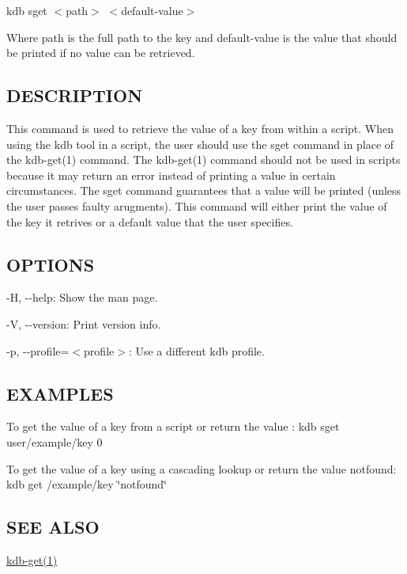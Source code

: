 {\ttfamily kdb sget $<$path$>$ $<$default-\/value$>$}

Where {\ttfamily path} is the full path to the key and {\ttfamily default-\/value} is the value that should be printed if no value can be retrieved.

\subsection*{D\+E\+S\+C\+R\+I\+P\+T\+I\+O\+N}

This command is used to retrieve the value of a key from within a script. When using the kdb tool in a script, the user should use the {\ttfamily sget} command in place of the kdb-\/get(1) command. The kdb-\/get(1) command should not be used in scripts because it may return an error instead of printing a value in certain circumstances. The {\ttfamily sget} command guarantees that a value will be printed (unless the user passes faulty arugments). This command will either print the value of the key it retrives or a default value that the user specifies.

\subsection*{O\+P\+T\+I\+O\+N\+S}


\begin{DoxyItemize}
\item {\ttfamily -\/\+H}, {\ttfamily -\/-\/help}\+: Show the man page.
\item {\ttfamily -\/\+V}, {\ttfamily -\/-\/version}\+: Print version info.
\item {\ttfamily -\/p}, {\ttfamily -\/-\/profile}=$<$profile$>$\+: Use a different kdb profile.
\end{DoxyItemize}

\subsection*{E\+X\+A\+M\+P\+L\+E\+S}

To get the value of a key from a script or return the value {}\+: {\ttfamily kdb sget user/example/key 0}

To get the value of a key using a cascading lookup or return the value {\ttfamily notfound}\+: {\ttfamily kdb get /example/key \char`\"{}notfound\char`\"{}}

\subsection*{S\+E\+E A\+L\+S\+O}


\begin{DoxyItemize}
\item \hyperlink{md_doc_help_kdb-get_doc_help_kdb-get_md}{kdb-\/get(1)} 
\end{DoxyItemize}